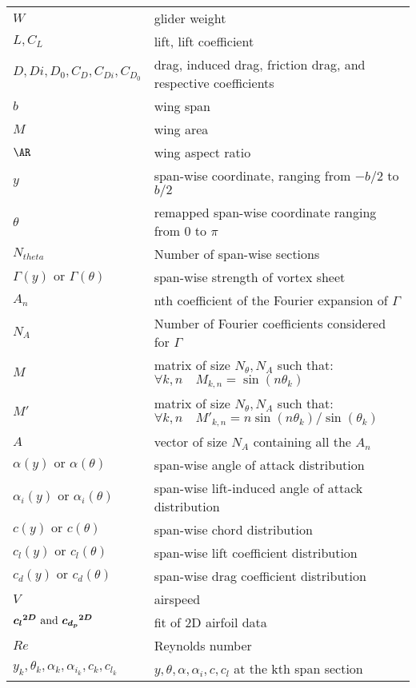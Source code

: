 \documentclass[letterpaper,12pt]{article}
\begin{document}
{\renewcommand\arraystretch{1.0}
\noindent\begin{longtable}{@{}l @{\quad : \quad} l@{}}
$W$  & glider weight \\
$L, C_L$ & lift, lift coefficient \\
$D,Di,D_0, C_D,C_{Di},C_{D_0}$& drag, induced drag, friction drag, and respective coefficients \\
$b$ & wing span \\
$M$ & wing area \\
$\AR$ & wing aspect ratio \\
$y$ & span-wise coordinate, ranging from $-b/2$ to $b/2$ \\
$\theta$ & remapped span-wise coordinate ranging from $0$ to $\pi$ \\
$N_{theta}$ & Number of span-wise sections \\
$\Gamma(y) \text{ or } \Gamma(\theta)$ & span-wise strength of vortex sheet\\
$A_n$ & nth coefficient of the Fourier expansion of $\Gamma$ \\
$N_{A}$ & Number of Fourier coefficients considered for $\Gamma$ \\
$M$ & matrix of size $N_{\theta}, N_A$ such that: $ \forall k,n \quad M_{k,n} = \sin(n\theta_k)$ \\
$M'$ & matrix of size $N_{\theta}, N_A$ such that: $ \forall k,n \quad {M'}_{k,n} = n\sin(n\theta_k)/\sin(\theta_k)$ \\
$A$ & vector of size $N_A$ containing all the $A_n$ \\
$\alpha(y) \text{ or } \alpha(\theta)$ & span-wise angle of attack distribution\\
$\alpha_i(y) \text{ or } \alpha_i(\theta)$ & span-wise lift-induced angle of attack distribution\\
$c(y) \text{ or } c(\theta)$ & span-wise chord distribution\\
$c_l(y) \text{ or } c_l(\theta)$ & span-wise lift coefficient distribution\\
$c_d(y) \text{ or } c_d(\theta)$ & span-wise drag coefficient distribution\\
$V$ & airspeed \\
$\boldsymbol{{c_l}^{2D}} \text{ and } \boldsymbol{{c_{d_p}}^{2D}} $ & fit of 2D airfoil data \\
$Re$ & Reynolds number \\
$y_k, \theta_k, \alpha_k, \alpha_{i_k}, c_k, c_{l_k}$ &  $y, \theta, \alpha, \alpha_i, c, c_{l}$ at the kth span section\\
\end{longtable}}
\end{document}
